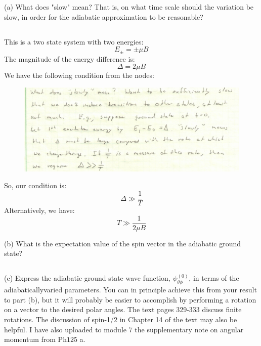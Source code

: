 \documentclass[12pt]{article}
\begin{document}
(a) What does "slow" mean? That is, on what time scale should the variation be slow, in order for the adiabatic approximation to be reasonable?
\subsection{}
This is a two state system with two energies:
\begin{equation}
  E_{\pm}=\pm \mu B
\end{equation}
The magnitude of the energy difference is:
\begin{equation}
  \Delta = 2\mu B
\end{equation}
We have the following condition from the nodes:
\begin{figure}
  \centering
  \includegraphics[scale=0.5]{adiabatic.png}
\end{figure}
So, our condition is:
\begin{equation}
  \Delta  \gg \frac{1}{T}
\end{equation}
Alternatively, we have:
\begin{equation}
  T \gg \frac{1}{2\mu B}
\end{equation}

(b) What is the expectation value of the spin vector in the adiabatic ground state?
\subsection{}

(c) Express the adiabatic ground state wave function, $\psi_{\theta \phi}^{(0)}$, in terms of the adiabaticallyvaried parameters. You can in principle achieve this from your result to part (b), but it will probably be easier to accomplish by performing a rotation on a vector to the desired polar angles. The text pages 329-333 discuss finite rotations. The discussion of spin-1/2 in Chapter 14 of the text may also be helpful. I have also uploaded to module 7 the supplementary note on angular momentum from $\mathrm{Ph} 125$ a.
\end{document}
